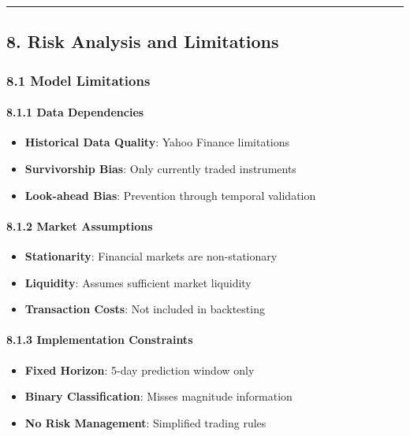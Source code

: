 \begin{center}\rule{0.5\linewidth}{0.5pt}\end{center}

\subsection{8. Risk Analysis and
Limitations}\label{risk-analysis-and-limitations}

\subsubsection{8.1 Model Limitations}\label{model-limitations}

\paragraph{8.1.1 Data Dependencies}\label{data-dependencies}

\begin{itemize}
\tightlist
\item
  \textbf{Historical Data Quality}: Yahoo Finance limitations
\item
  \textbf{Survivorship Bias}: Only currently traded instruments
\item
  \textbf{Look-ahead Bias}: Prevention through temporal validation
\end{itemize}

\paragraph{8.1.2 Market Assumptions}\label{market-assumptions}

\begin{itemize}
\tightlist
\item
  \textbf{Stationarity}: Financial markets are non-stationary
\item
  \textbf{Liquidity}: Assumes sufficient market liquidity
\item
  \textbf{Transaction Costs}: Not included in backtesting
\end{itemize}

\paragraph{8.1.3 Implementation
Constraints}\label{implementation-constraints}

\begin{itemize}
\tightlist
\item
  \textbf{Fixed Horizon}: 5-day prediction window only
\item
  \textbf{Binary Classification}: Misses magnitude information
\item
  \textbf{No Risk Management}: Simplified trading rules
\end{itemize}

